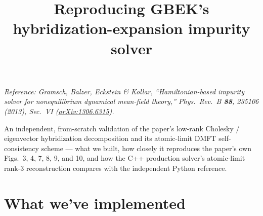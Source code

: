 \documentclass[11pt]{article}
\title{\Large Reproducing GBEK's hybridization-expansion impurity solver}
\author{}
\date{}
\begin{document}
\maketitle
\vspace{-3.5em}

\begin{center}
\begin{minipage}{0.85\textwidth}
\small
\emph{Reference: Gramsch, Balzer, Eckstein \& Kollar, ``Hamiltonian-based
impurity solver for nonequilibrium dynamical mean-field theory,'' Phys.\
Rev.\ B \textbf{88}, 235106 (2013), Sec.\ VI
(\href{https://arxiv.org/abs/1306.6315}{arXiv:1306.6315}).}

\medskip
An independent, from-scratch validation of the paper's low-rank Cholesky /
eigenvector hybridization decomposition and its atomic-limit DMFT
self-consistency scheme --- what we built, how closely it reproduces the
paper's own Figs.\ 3, 4, 7, 8, 9, and 10, and how the C++ production
solver's atomic-limit rank-3 reconstruction compares with the independent
Python reference.
\end{minipage}
\end{center}

\vspace{1.5em}

\section*{What we've implemented}
\end{document}
